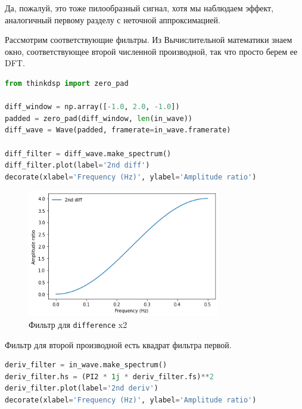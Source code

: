 \documentclass[a4paper,12pt]{report}
\begin{document}
    Да, пожалуй, это тоже пилообразный сигнал, хотя мы наблюдаем эффект, аналогичный первому разделу с неточной аппроксимацией.
    
    Рассмотрим соответствующие фильтры. Из Вычислительной математики знаем окно, соответствующее второй численной производной, так что просто берем ее DFT.
    
\begin{lstlisting}[language=Python,caption=Фильтр для \texttt{difference} x2]
from thinkdsp import zero_pad

diff_window = np.array([-1.0, 2.0, -1.0])
padded = zero_pad(diff_window, len(in_wave))
diff_wave = Wave(padded, framerate=in_wave.framerate)

diff_filter = diff_wave.make_spectrum()
diff_filter.plot(label='2nd diff')
decorate(xlabel='Frequency (Hz)', ylabel='Amplitude ratio')
\end{lstlisting}

    \begin{figure}[H]
        \centering
        \includegraphics[width=0.75\textwidth]{ex4_window_1.png}
        \caption{Фильтр для \texttt{difference} x2}
        \label{fig:ex4_window_1}
    \end{figure}

    Фильтр для второй производной есть квадрат фильтра первой.
    
\begin{lstlisting}[language=Python,caption=Фильтр для \texttt{differentiate} x2]
deriv_filter = in_wave.make_spectrum()
deriv_filter.hs = (PI2 * 1j * deriv_filter.fs)**2
deriv_filter.plot(label='2nd deriv')
decorate(xlabel='Frequency (Hz)', ylabel='Amplitude ratio')
\end{lstlisting}
\end{document}
